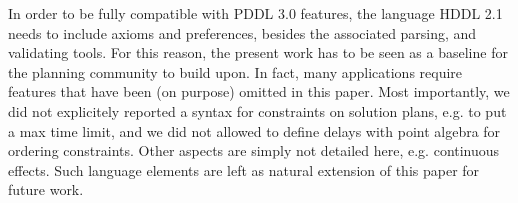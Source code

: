 \documentclass[letterpaper]{article} %
\begin{document}
In order to be fully compatible with PDDL 3.0 features, the language HDDL 2.1 needs to include axioms and preferences, besides the associated parsing, and validating tools. For this reason, the present work has to be seen as a baseline for the planning community to build upon.
In fact, many applications require features that have been (on purpose) omitted in this paper. Most importantly, we did not explicitely reported a syntax for constraints on solution plans, e.g. to put a max time limit, and we did not allowed to define delays  with point algebra for ordering constraints. Other aspects are simply not detailed here, e.g. continuous effects.
Such language elements are left as natural extension of this paper for future work.



\appendix

\end{document}
